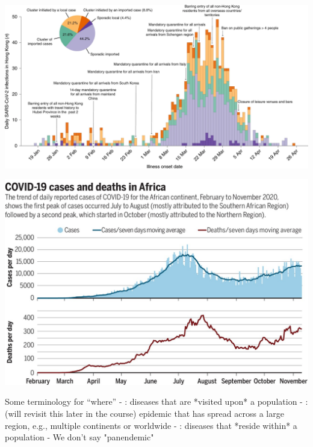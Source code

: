 \documentclass[aspectratio=43]{beamer}
\begin{document}
\begin{frame}
    \includegraphics[width=\textwidth]{../FIGS/41591_2020_1092_Fig1_HTML.png}
\end{frame}


\begin{frame}
    \includegraphics[width=\textwidth]{../FIGS/371_27_f1.jpeg}
\end{frame}


\begin{frame}{Some terminology for ``where''}
- : diseases that are *visited upon* a population
\vfill
- : (will revisit this later in the course) epidemic that has spread across a large region, e.g., multiple continents or worldwide
\vfill
- : diseases that *reside within* a population
\vfill
- We don't say "panendemic"
\end{frame}
\end{document}
